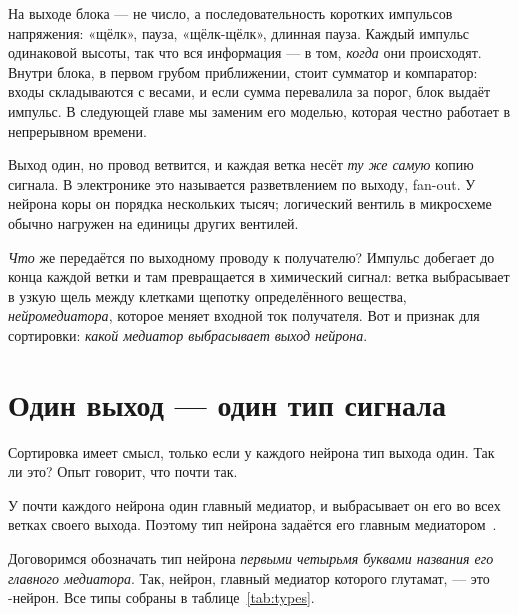 На выходе блока --- не число, а последовательность коротких импульсов напряжения: «щёлк», пауза, «щёлк-щёлк», длинная пауза. Каждый импульс одинаковой высоты, так что вся информация --- в том, \emph{когда} они происходят. Внутри блока, в первом грубом приближении, стоит сумматор и компаратор: входы складываются с весами, и если сумма перевалила за порог, блок выдаёт импульс. В следующей главе мы заменим его моделью, которая честно работает в непрерывном времени.

Выход один, но провод ветвится, и каждая ветка несёт \emph{ту же самую} копию сигнала. В электронике это называется разветвлением по выходу, fan-out. У нейрона коры он порядка нескольких тысяч; логический вентиль в микросхеме обычно нагружен на единицы других вентилей.

\emph{Что} же передаётся по выходному проводу к получателю? Импульс добегает до конца каждой ветки и там превращается в химический сигнал: ветка выбрасывает в узкую щель между клетками щепотку определённого вещества, \emph{нейромедиатора}, которое меняет входной ток получателя. Вот и признак для сортировки: \emph{какой медиатор выбрасывает выход нейрона}.

\section{Один выход --- один тип сигнала}

Сортировка имеет смысл, только если у каждого нейрона тип выхода один. Так ли это? Опыт говорит, что почти так.

\begin{keyblock}
\begin{proposition}
\label{prop:dale}
У почти каждого нейрона один главный медиатор, и выбрасывает он его во всех ветках своего выхода. Поэтому тип нейрона задаётся его главным медиатором~\cite{Strata1999}.
\end{proposition}
\end{keyblock}

Договоримся обозначать тип нейрона \emph{первыми четырьмя буквами названия его главного медиатора}. Так, нейрон, главный медиатор которого глутамат, --- это -нейрон. Все типы собраны в таблице~\ref{tab:types}.

